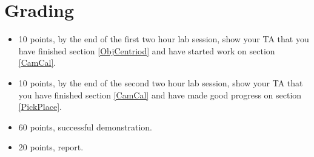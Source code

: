 \section{Grading}
\begin{itemize}
\item 10 points, by the end of the first two hour lab session, show your TA that you have finished section \ref{ObjCentriod} and have started work on
section \ref{CamCal}.
\item 10 points, by the end of the second two hour lab session, show your TA that you have finished section \ref{CamCal} and have made good progress on
section \ref{PickPlace}.
\item 60 points, successful demonstration.
\item 20 points, report.
\end{itemize}